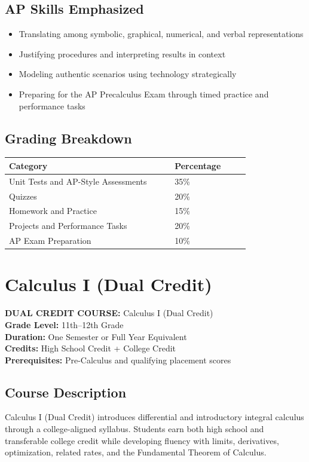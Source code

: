 \documentclass[12pt,oneside]{book}
\begin{document}
\section{AP Skills Emphasized}
\begin{itemize}[leftmargin=2em]
    \item Translating among symbolic, graphical, numerical, and verbal representations
    \item Justifying procedures and interpreting results in context
    \item Modeling authentic scenarios using technology strategically
    \item Preparing for the AP Precalculus Exam through timed practice and performance tasks
\end{itemize}

\section{Grading Breakdown}
\begin{center}
\begin{tabular}{L{0.55\linewidth}L{0.25\linewidth}}
\toprule
\textbf{Category} & \textbf{Percentage} \\
\midrule
Unit Tests and AP-Style Assessments & 35\% \\
Quizzes & 20\% \\
Homework and Practice & 15\% \\
Projects and Performance Tasks & 20\% \\
AP Exam Preparation & 10\% \\
\bottomrule
\end{tabular}
\end{center}

\chapter{Calculus I (Dual Credit)}

\noindent\textbf{DUAL CREDIT COURSE:} Calculus I (Dual Credit)\\
\textbf{Grade Level:} 11th--12th Grade\\
\textbf{Duration:} One Semester or Full Year Equivalent\\
\textbf{Credits:} High School Credit + College Credit\\
\textbf{Prerequisites:} Pre-Calculus and qualifying placement scores

\section{Course Description}
Calculus I (Dual Credit) introduces differential and introductory integral calculus through a college-aligned
syllabus. Students earn both high school and transferable college credit while developing fluency with limits,
derivatives, optimization, related rates, and the Fundamental Theorem of Calculus.
\end{document}
